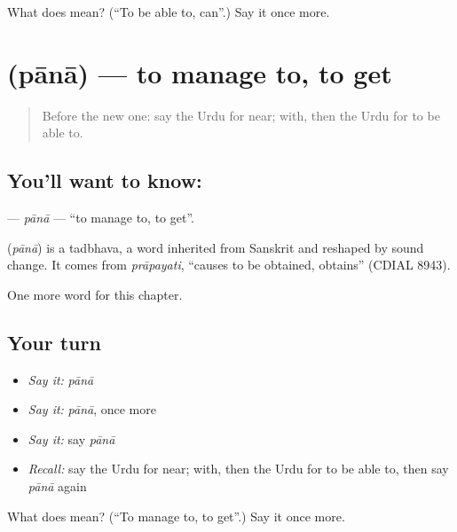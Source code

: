 \begin{tcolorbox}[breakable,colback=teal!4,colframe=teal!35!black,title={Before you move on}]
What does  mean? (\textquotedblleft{}To be able to, can\textquotedblright{}.) Say it once more.
\end{tcolorbox}
\section[\texorpdfstring{\ur{پانا} (pānā)}{پانا (pānā)}]{ (pānā) — to manage to, to get}

\label{lesson:UR-C103-pana}



\begin{quote}
Before the new one: say the Urdu for near; with, then the Urdu for to be able to.
\end{quote}

\subsection*{You'll want to know: }
\textbf{} — \emph{pānā} — \textquotedblleft{}to manage to, to get\textquotedblright{}.

\begin{cousinweb}
\textbf{} (\emph{pānā}) is a tadbhava, a word inherited from Sanskrit and reshaped by sound change. It comes from \emph{prāpayati}, \textquotedblleft{}causes to be obtained, obtains\textquotedblright{} (CDIAL 8943).
\end{cousinweb}

\begin{grammarlens}[title={What you've built}]
One more word for this chapter.
\end{grammarlens}

\subsection*{Your turn}
\begin{itemize}
\raggedright
  \item \emph{Say it:} \emph{pānā}
  \item \emph{Say it:} \emph{pānā}, once more
  \item \emph{Say it:} say \emph{pānā}
  \item \emph{Recall:} say the Urdu for near; with, then the Urdu for to be able to, then say \emph{pānā} again
\end{itemize}

\begin{tcolorbox}[breakable,colback=teal!4,colframe=teal!35!black,title={Before you move on}]
What does  mean? (\textquotedblleft{}To manage to, to get\textquotedblright{}.) Say it once more.
\end{tcolorbox}
